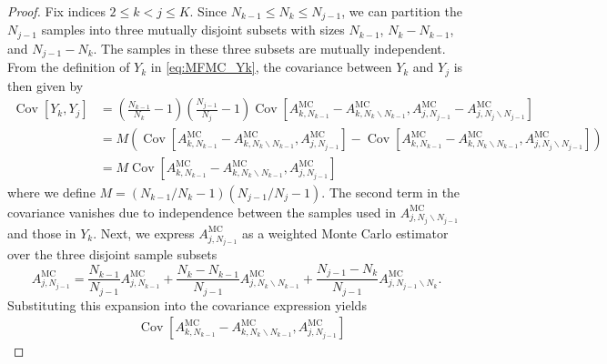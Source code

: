 \begin{proof}
Fix indices $2\le k<j\le K$. Since $N_{k-1}\le N_k\le N_{j-1}$, we can partition the $N_{j-1}$ samples into three mutually disjoint subsets with sizes $N_{k-1}$, $N_{k}-N_{k-1}$, and $N_{j-1} - N_{k}$. The samples in these three subsets are mutually independent. From the definition of $Y_k$ in \eqref{eq:MFMC_Yk},  the covariance between $Y_k$ and $Y_j$ is then given by
\begin{align*}
    \operatorname{Cov}\left[Y_k,Y_j\right] &= \left(\frac{N_{k-1}}{N_k}-1\right) \left(\frac{N_{j-1}}{N_j}-1\right)\operatorname{Cov}\left[A_{k, N_{k-1}}^{\text{MC}} - A_{k,N_{k}\backslash N_{k-1}}^{\text{MC}}, A_{j,N_{j-1}}^{\text{MC}} - A_{j,N_{j}\backslash N_{j-1}}^{\text{MC}}\right] \\
    & = M \left(\operatorname{Cov}\left[A_{k,N_{k-1}}^{\text{MC}} - A_{k,N_{k}\backslash N_{k-1}}^{\text{MC}}, A_{j,N_{j-1}}^{\text{MC}}\right] - \operatorname{Cov}\left[A_{k,N_{k-1}}^{\text{MC}} - A_{k,N_{k}\backslash N_{k-1}}^{\text{MC}}, A_{j,N_{j}\backslash N_{j-1}}^{\text{MC}}\right] \right)\\
    & = M \operatorname{Cov}\left[A_{k,N_{k-1}}^{\text{MC}} - A_{k,N_{k}\backslash N_{k-1}}^{\text{MC}}, A_{j,N_{j-1}}^{\text{MC}}\right]
\end{align*}
where we define $M = (N_{k-1}/N_k-1) (N_{j-1}/N_j-1)$. The second term in the covariance vanishes due to independence between the samples used in $A_{j,N_{j}\backslash N_{j-1}}^{\text{MC}}$ and those in $Y_k$. Next, we express $A_{j,N_{j-1}}^{\text{MC}}$ as a weighted Monte Carlo estimator over the three disjoint sample subsets
%
\begin{equation*}
    A_{j,N_{j-1}}^{\text{MC}} = \frac{N_{k-1}}{N_{j-1}}A_{j,N_{k-1}}^{\text{MC}} + \frac{N_k - N_{k-1}}{N_{j-1}} A_{j,N_{k}\backslash N_{k-1}}^{\text{MC}} + \frac{N_{j-1} - N_k}{N_{j-1}} A_{j,N_{j-1}\backslash N_{k}}^{\text{MC}}.
\end{equation*}
%
Substituting this expansion into the covariance expression yields
%
\begin{align*}
    &\operatorname{Cov}\left[A_{k,N_{k-1}}^{\text{MC}} - A_{k,N_{k}\backslash N_{k-1}}^{\text{MC}}, A_{j,N_{j-1}}^{\text{MC}}\right]

\end{align*}
\end{proof}
